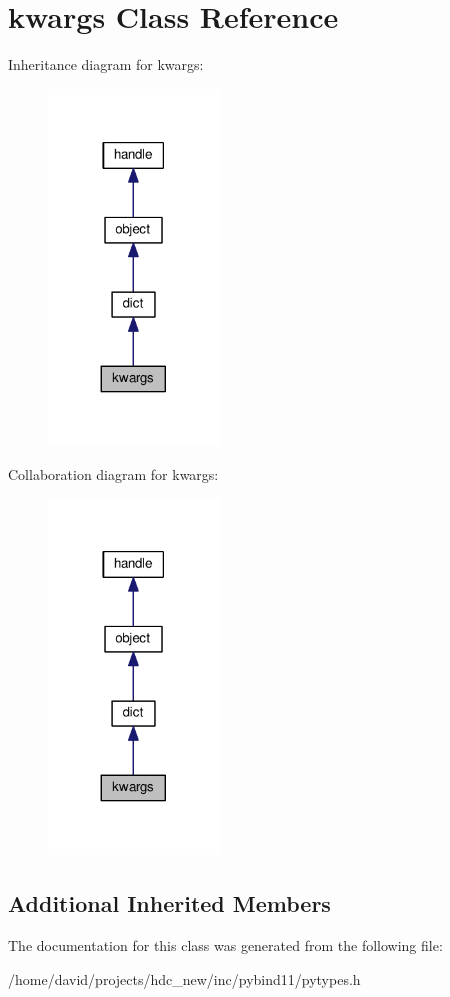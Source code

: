 \hypertarget{classkwargs}{}\section{kwargs Class Reference}
\label{classkwargs}


Inheritance diagram for kwargs\+:
\nopagebreak
\begin{figure}[H]
\begin{center}
\leavevmode
\includegraphics[width=128pt]{classkwargs__inherit__graph}
\end{center}
\end{figure}


Collaboration diagram for kwargs\+:
\nopagebreak
\begin{figure}[H]
\begin{center}
\leavevmode
\includegraphics[width=128pt]{classkwargs__coll__graph}
\end{center}
\end{figure}
\subsection*{Additional Inherited Members}


The documentation for this class was generated from the following file\+:\begin{DoxyCompactItemize}
\item 
/home/david/projects/hdc\+\_\+new/inc/pybind11/pytypes.\+h\end{DoxyCompactItemize}
